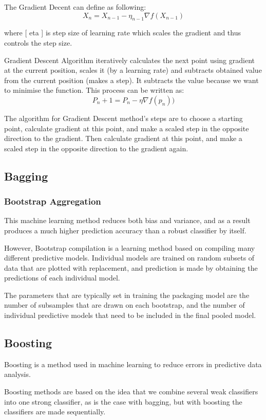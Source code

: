 \begin{Methods}
The Gradient Decent can define as following:
\[
X_{n}= X_{n-1} - \eta_{n-1}\nabla f(X_{n-1})
\]

where
[
eta
]
 is step size of learning rate which scales the gradient and thus controls the step size.
 
Gradient Descent Algorithm iteratively calculates the next point using gradient at the current position, scales it (by a learning rate) and subtracts obtained value from the current position (makes a step). It subtracts the value because we want to minimise the function. This process can be written as:
\[
P_{n}+1=P_{n}-\eta\nabla f(p_{n}))
\]

The algorithm for Gradient Descent method’s steps are to choose a starting point, calculate gradient at this point, and make a scaled step in the opposite direction to the gradient. Then calculate gradient at this point, and make a scaled step in the opposite direction to the gradient again.


\subsection{Bagging}
\subsubsection{Bootstrap Aggregation}
This machine learning method reduces both bias and variance, and as a result produces a much higher prediction accuracy than a robust classifier by itself. 

However, Bootstrap compilation is a learning method based on compiling many different predictive models. Individual models are trained on random subsets of data that are plotted with replacement, and prediction is made by obtaining the predictions of each individual model.


The parameters that are typically set in training the packaging model are the number of subsamples that are drawn on each bootstrap, and the number of individual predictive models that need to be included in the final pooled model.

\subsection{Boosting}

Boosting is a method used in machine learning to reduce errors in predictive data analysis.

Boosting methods are based on the idea that we combine several weak classifiers into one strong classifier, as is the case with bagging, but with boosting the classifiers are made sequentially. 


\end{Methods}
